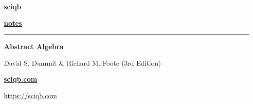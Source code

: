 \documentclass[11pt,a4paper,oneside]{article}
\begin{document}
\thispagestyle{empty}

\begin{center}
    \vspace*{\fill}
    
    {\fontsize{85}{95}\selectfont\textbf{\textsf{\href{https://sciqb.com}{\color{primaryblue}sciqb}}}}\par
    \vspace{10pt}
    {\fontsize{50}{60}\selectfont\textbf{\textsf{\href{https://sciqb.com}{\color{accentteal}notes}}}}\par
    
    \vspace{35pt}
    {\color{accentteal}\rule{0.35\textwidth}{1.5pt}}\par
    \vspace{25pt}
    
    {\LARGE\textbf{\textsf{\color{darkgray}Abstract Algebra}}\par}
    \vspace{8pt}
    {\large\color{darkgray}David S. Dummit \& Richard M. Foote (3rd Edition)\par}
    
    \vspace{50pt}
    {\Large\textbf{\textsf{\href{https://sciqb.com}{\color{primaryblue}sciqb.com}}}\par}
    \vspace{8pt}
    {\small\color{darkgray}\url{https://sciqb.com}\par}
    
    \vspace*{\fill}
\end{center}
\end{document}
